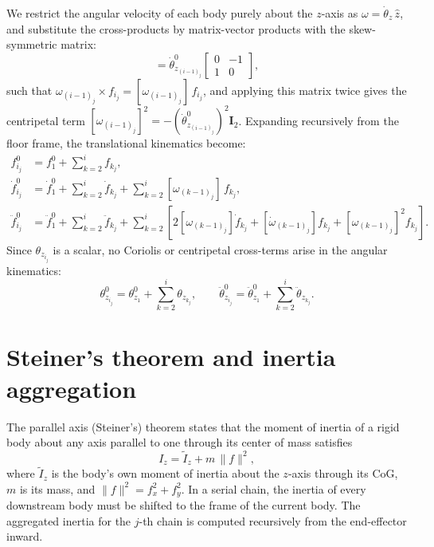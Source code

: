 \documentclass[11pt,letterpaper]{article}
\begin{document}
We restrict the angular velocity of each body purely about the $z$-axis as $\omega = \dot{\theta}_z\,\hat{z}$, and substitute the cross-products by matrix-vector products with the skew-symmetric matrix:
\begin{equation}
    [\omega_{(i-1)_j}] = \dot{\theta}^{0}_{z_{(i-1)_j}}
    \begin{bmatrix} 0 & -1 \\ 1 & 0 \end{bmatrix},
\end{equation}
such that $\omega_{(i-1)_j} \times f_{i_j} = [\omega_{(i-1)_j}]\,f_{i_j}$, and applying this matrix twice gives the centripetal term $[\omega_{(i-1)_j}]^2 = -(\dot{\theta}^{0}_{z_{(i-1)_j}})^2 \mathbf{I}_2$. Expanding recursively from the floor frame, the translational kinematics become:
\begin{align}
    f^{0}_{i_j}        &= f^{0}_{1} + \sum^{i}_{k=2} f_{k_j}, \\
    \dot{f}^{0}_{i_j}  &= \dot{f}^{0}_{1} + \sum^{i}_{k=2} \dot{f}_{k_j}
                          + \sum^{i}_{k=2} [\omega_{(k-1)_j}]\, f_{k_j}, \\
    \ddot{f}^{0}_{i_j} &= \ddot{f}^{0}_{1} + \sum^{i}_{k=2} \ddot{f}_{k_j}
                          + \sum^{i}_{k=2}\!\left[
                              2[\omega_{(k-1)_j}]\dot{f}_{k_j}
                              + [\dot{\omega}_{(k-1)_j}]f_{k_j}
                              + [\omega_{(k-1)_j}]^2 f_{k_j}
                          \right].
\end{align}
Since $\theta_{z_{i_j}}$ is a scalar, no Coriolis or centripetal cross-terms arise in the angular kinematics:
\begin{equation}
    \theta^{0}_{z_{i_j}} = \theta^{0}_{z_1} + \sum^{i}_{k=2} \theta_{z_{k_j}},
    \qquad
    \ddot{\theta}^{0}_{z_{i_j}} = \ddot{\theta}^{0}_{z_1} + \sum^{i}_{k=2} \ddot{\theta}_{z_{k_j}}.
\end{equation}

\section*{Steiner's theorem and inertia aggregation}

The parallel axis (Steiner's) theorem states that the moment of inertia of a rigid body about any axis parallel to one through its center of mass satisfies
\begin{equation}
    I_z = \tilde{I}_z + m\,\|f\|^2,
\end{equation}
where $\tilde{I}_z$ is the body's own moment of inertia about the $z$-axis through its CoG, $m$ is its mass, and $\|f\|^2 = f_x^2 + f_y^2$. In a serial chain, the inertia of every downstream body must be shifted to the frame of the current body. The aggregated inertia for the $j$-th chain is computed recursively from the end-effector inward.
\end{document}
